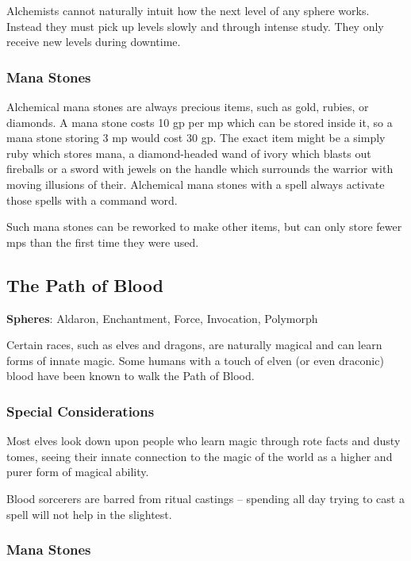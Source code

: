 \begin{multicols}{2}
Alchemists cannot naturally intuit how the next level of any sphere works.
Instead they must pick up levels slowly and through intense study.
They only receive new levels during \gls{downtime}.

\subsubsection{Mana Stones}

Alchemical mana stones are always precious items, such as gold, rubies, or diamonds.  A mana stone costs 10 gp per \gls{mp} which can be stored inside it, so a mana stone storing 3 \gls{mp} would cost 30 gp. The exact item might be a simply ruby which stores mana, a diamond-headed wand of ivory which blasts out fireballs or a sword with jewels on the handle which surrounds the warrior with moving illusions of their. Alchemical mana stones with a spell always activate those spells with a command word.

Such mana stones can be reworked to make other items, but can only store fewer \glspl{mp} than the first time they were used.

\subsection{The Path of Blood}

\textbf{Spheres}: Aldaron, Enchantment, Force, Invocation, Polymorph

\noindent Certain races, such as elves and dragons, are naturally magical and can learn forms of innate magic. Some humans with a touch of elven (or even draconic) blood have been known to walk the Path of Blood.

\subsubsection{Special Considerations}

Most elves look down upon people who learn magic through rote facts and dusty tomes, seeing their innate connection to the magic of the world as a higher and purer form of magical ability.

Blood sorcerers are barred from ritual castings -- spending all day trying to cast a spell will not help in the slightest.

\subsubsection{Mana Stones}


\end{multicols}
